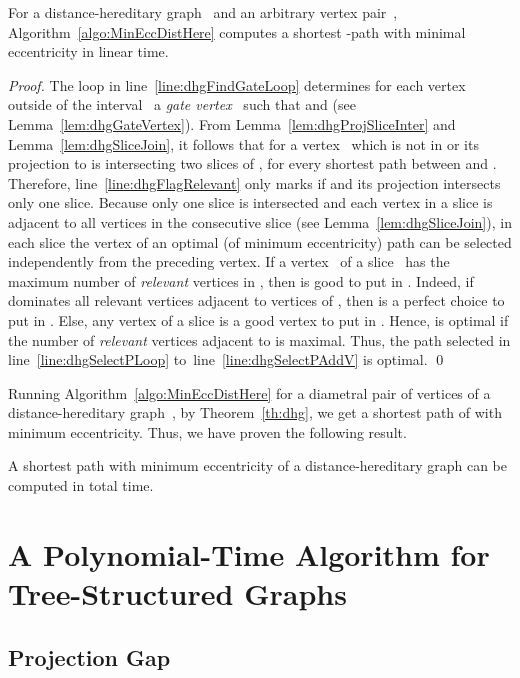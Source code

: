 \documentclass[10pt]{llncs}
\begin{document}
\begin{lemma}
    \label{lm:path-pair} 
For a distance-hereditary graph~ and an arbitrary vertex pair~, Algorithm~\ref{algo:MinEccDistHere} computes a shortest -path with minimal eccentricity in linear time.
\end{lemma}

\begin{proof}
The loop in line~\ref{line:dhgFindGateLoop} determines for each vertex~ outside of the interval~ a \emph{gate vertex}~ such that  and  (see Lemma~\ref{lem:dhgGateVertex}).
From Lemma~\ref{lem:dhgProjSliceInter} and Lemma~\ref{lem:dhgSliceJoin}, it follows that for a vertex~ which is not in  or its projection to  is intersecting two slices of ,  for every shortest path  between  and .
Therefore, line~\ref{line:dhgFlagRelevant} only marks  if  and its projection  intersects only one slice. 
Because only one slice is intersected and each vertex in a slice is adjacent to all vertices in the consecutive slice (see Lemma~\ref{lem:dhgSliceJoin}), in each slice the vertex of an optimal (of minimum eccentricity) path  can be selected independently from the preceding vertex.
If a vertex~ of a slice~ has the maximum number of \emph{relevant} vertices in , then  is good to put in .
Indeed, if  dominates all relevant vertices adjacent to vertices of , then  is a perfect choice to put in .
Else, any vertex  of a slice  is a good vertex to put in . 
Hence,  is optimal if the number of \emph{relevant} vertices adjacent to  is maximal.
Thus, the path selected in line~\ref{line:dhgSelectPLoop} to~line~\ref{line:dhgSelectPAddV} is optimal.
\qed
\end{proof}

Running Algorithm~\ref{algo:MinEccDistHere} for a diametral pair of vertices of a distance-hereditary graph~, by Theorem~\ref{th:dhg}, we get a shortest path of  with minimum eccentricity.
Thus, we have proven the following result. 

\begin{theorem}
    \label{tm:opt-path} 
A shortest path with minimum eccentricity of a distance-hereditary graph  can be computed in  total time.
\end{theorem}

\section{A Polynomial-Time Algorithm for Tree-Structured Graphs}

\subsection{Projection Gap}
\end{document}
